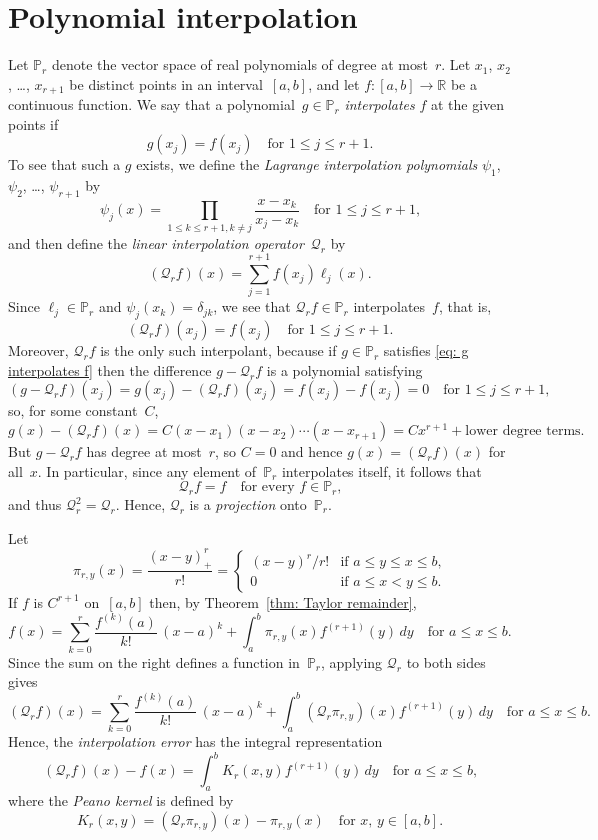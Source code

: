 \section{Polynomial interpolation}

Let $\mathbb{P}_r$ denote the vector space of real polynomials of degree at 
most~$r$.  Let $x_1$, $x_2$, \dots, $x_{r+1}$ be distinct points in an 
interval~$[a,b]$, and let $f:[a,b]\to\mathbb{R}$ be a continuous function.  We 
say that a polynomial~$g\in\mathbb{P}_r$ \emph{interpolates} $f$ at the given 
points if
\begin{equation}\label{eq: g interpolates f}
g(x_j)=f(x_j)\quad\text{for $1\le j\le r+1$.}
\end{equation}
To see that such a $g$ exists, we define the \emph{Lagrange 
interpolation polynomials} $\psi_1$, $\psi_2$, \dots, $\psi_{r+1}$ by
\[
\psi_j(x)=\prod_{1\le k\le r+1, k\ne j}
	\frac{x-x_k}{x_j-x_k}\quad\text{for $1\le j\le r+1$,}
\]
and then define the \emph{linear interpolation operator}~$\mathcal{Q}_r$ by
\[
(\mathcal{Q}_rf)(x)=\sum_{j=1}^{r+1}f(x_j)\ell_j(x).
\]
Since $\ell_j\in\mathbb{P}_r$ and $\psi_j(x_k)=\delta_{jk}$, we see that
$\mathcal{Q}_rf\in\mathbb{P}_r$ interpolates~$f$, that is,
\[
(\mathcal{Q}_rf)(x_j)=f(x_j)\quad\text{for $1\le j\le r+1$.}
\]
Moreover, $\mathcal{Q}_rf$ is the only such interpolant, because if 
$g\in\mathbb{P}_r$ satisfies \eqref{eq: g interpolates f} then the difference
$g-\mathcal{Q}_rf$ is a polynomial satisfying
\[
(g-\mathcal{Q}_rf)(x_j)=g(x_j)-(\mathcal{Q}_rf)(x_j)=f(x_j)-f(x_j)=0
	\quad\text{for $1\le j\le r+1$,}
\]
so, for some constant~$C$,
\[
g(x)-(\mathcal{Q}_rf)(x)=C(x-x_1)(x-x_2)\cdots(x-x_{r+1}) 
	=Cx^{r+1}+\text{lower degree terms}.
\]
But $g-\mathcal{Q}_rf$ has degree at most~$r$, so $C=0$ and hence
$g(x)=(\mathcal{Q}_rf)(x)$ for all~$x$. In particular, since any element 
of~$\mathbb{P}_r$ interpolates itself, it follows that
\[
\mathcal{Q}_rf=f\quad\text{for every $f\in\mathbb{P}_r$,}
\]
and thus $\mathcal{Q}_r^2=\mathcal{Q}_r$.  Hence, $\mathcal{Q}_r$ is a 
\emph{projection} onto~$\mathbb{P}_r$.

Let 
\[
\pi_{r,y}(x)=\frac{(x-y)_+^r}{r!}=\begin{cases}
	(x-y)^r/r!&\text{if $a\le y\le x\le b$,}\\
	0&\text{if $a\le x<y\le b$.}
\end{cases}
\]
If $f$ is $C^{r+1}$ on~$[a,b]$ then, by Theorem~\ref{thm: Taylor remainder}, 
\[
f(x)=\sum_{k=0}^r\frac{f^{(k)}(a)}{k!}\,(x-a)^k
	+\int_a^b\pi_{r,y}(x)f^{(r+1)}(y)\,dy\quad\text{for $a\le x\le b$.}
\]
Since the sum on the right defines a function in~$\mathbb{P}_r$,
applying $\mathcal{Q}_r$ to both sides gives
\[
(\mathcal{Q}_rf)(x)=\sum_{k=0}^r\frac{f^{(k)}(a)}{k!}\,(x-a)^k
	+\int_a^b(\mathcal{Q}_r\pi_{r,y})(x)f^{(r+1)}(y)\,dy
\quad\text{for $a\le x\le b$.}
\]
Hence, the \emph{interpolation error} has the integral representation
\begin{equation}\label{eq: Qr f error}
(\mathcal{Q}_rf)(x)-f(x)=\int_a^b K_r(x,y)f^{(r+1)}(y)\,dy
\quad\text{for $a\le x\le b$,}
\end{equation}
where the \emph{Peano kernel} is defined by
\[
K_r(x,y)=(\mathcal{Q}_r\pi_{r,y})(x)-\pi_{r,y}(x)
	\quad\text{for $x$, $y\in[a,b]$.}
\]

